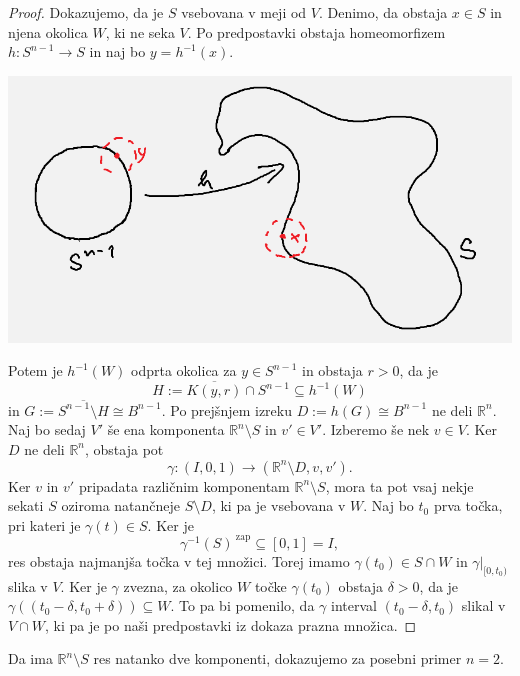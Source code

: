 \documentclass[10pt, a4paper]{article}
\newenvironment{noticeC}{%
  \tcolorbox[%
  notitle,
  empty,
  enhanced,  %
  breakable,
  coltext=black, 
  fontupper=\rmfamily,
  parbox=false,
  noparskip,
  sharp corners,
  boxrule=-1pt,  %
  frame hidden,
  left=7pt,  %
  right=7pt,
  top=5pt,
  bottom=5pt,
  before skip=2.5ex plus 2pt,
  after skip=2.5ex plus 2pt,
  overlay unbroken and last={%
  },
  ]}
{\endtcolorbox}
\newenvironment{dokaz}%
  {\begin{noticeC}\begin{proof}}%
  {\end{proof}\end{noticeC}}
\newcommand{\R}{\mathbb {R}}
\begin{document}
\begin{dokaz}
  Dokazujemo, da je $S$ vsebovana v meji od $V$. Denimo, da obstaja $x \in S$ in njena okolica $W$, ki ne seka $V$.
  Po predpostavki obstaja homeomorfizem $h: S^{n - 1} \to S$ in naj bo $y = h^{-1} (x)$.
  \begin{center}
    \includegraphics[scale=0.5]{dokaz4.png}
  \end{center}
  Potem je $h^{-1} (W)$ odprta okolica za $y \in S^{n - 1}$ in obstaja $r > 0$, da je 
  $$H := \overline{K(y, r)} \cap S^{n - 1} \subseteq h^{-1} (W)$$ in $G := \overline{S^{n - 1} \setminus H} \cong B^{n - 1}.$
  Po prejšnjem izreku $D := h(G) \cong B^{n - 1}$ ne deli $\R^n$. Naj bo sedaj $V'$ še ena komponenta $\R^n \setminus S$
  in $v' \in V'$. Izberemo še nek $v \in V$. Ker $D$ ne deli $\R^n$, obstaja pot 
  $$\gamma: (I, 0, 1) \to (\R^n \setminus D, v, v').$$
  Ker $v$ in $v'$ pripadata različnim komponentam $\R^n \setminus S$, mora ta pot vsaj nekje sekati $S$ oziroma natančneje 
  $S \setminus D$, ki pa je vsebovana v $W$. Naj bo $t_0$ prva točka, pri kateri je $\gamma (t) \in S$.
  Ker je $$\gamma^{-1} (S)^{\ \text{zap}} \subseteq [0, 1] = I,$$
  res obstaja najmanjša točka v tej množici.
  Torej imamo $\gamma(t_0) \in S \cap W$ in $\gamma\big|_{[0, t_0)}$ slika v $V$.
  Ker je $\gamma$ zvezna, za okolico $W$ točke $\gamma(t_0)$ obstaja $\delta > 0$, da je 
  $\gamma((t_0 - \delta, t_0 + \delta)) \subseteq W$. To pa bi pomenilo, da $\gamma$ interval $(t_0 - \delta, t_0)$
  slikal v $V \cap W$, ki pa je po naši predpostavki iz dokaza prazna množica.
\end{dokaz}

Da ima $\R^n \setminus S$ res natanko dve komponenti, dokazujemo za posebni primer $n = 2$.
\end{document}
